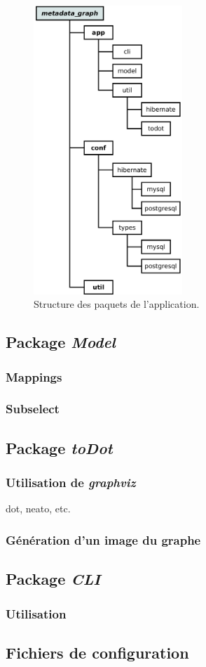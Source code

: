 \begin{figure}[H]
\centering
\includegraphics[width=0.5\textwidth]{files/archi}
\caption{Structure des paquets de l'application.}
\label{figure:structure_appli}
\end{figure}

\subsection{Package \emph{Model}}
\subsubsection{Mappings}
\subsubsection{Subselect}
\subsection{Package \emph{toDot}}
\subsubsection{Utilisation de \emph{graphviz}}
dot, neato, etc.
\subsubsection{Génération d'un image du graphe}
\subsection{Package \emph{CLI}}
\subsubsection{Utilisation}
\subsection{Fichiers de configuration}